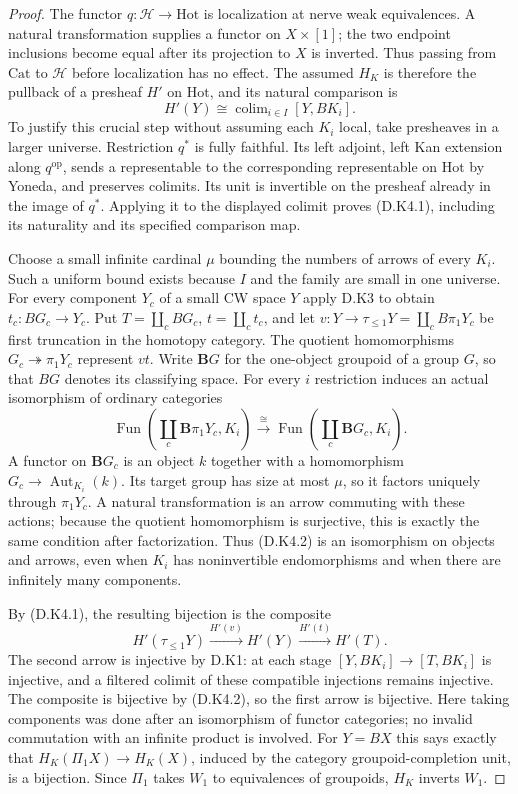\begin{proof}
The functor $q:\mathcal H\to\mathrm{Hot}$ is localization at
nerve weak equivalences. A natural transformation supplies a
functor on $X\times[1]$; the two endpoint inclusions become equal
after its projection to $X$ is inverted. Thus passing from
$\mathrm{Cat}$ to $\mathcal H$ before localization has no effect.
The assumed $H_K$ is therefore the pullback of a presheaf $H'$
on $\mathrm{Hot}$, and its natural comparison is
\[
 H'(Y)\cong\operatorname{colim}_{i\in I}[Y,BK_i].
 \tag{D.K4.1}
\]
To justify this crucial step without assuming each $K_i$ local,
take presheaves in a larger universe. Restriction $q^*$ is fully
faithful. Its left adjoint, left Kan extension along
$q^{\mathrm{op}}$, sends a representable to the corresponding
representable on $\mathrm{Hot}$ by Yoneda, and preserves colimits.
Its unit is invertible on the presheaf already in the image of
$q^*$. Applying it to the displayed colimit proves (D.K4.1),
including its naturality and its specified comparison map.

Choose a small infinite cardinal $\mu$ bounding the numbers of
arrows of every $K_i$. Such a uniform bound exists because $I$
and the family are small in one universe. For every component
$Y_c$ of a small CW space $Y$ apply D.K3 to obtain
$t_c:BG_c\to Y_c$. Put $T=\coprod_c BG_c$, $t=\coprod_c t_c$,
and let $v:Y\to\tau_{\leq1}Y=\coprod_c B\pi_1Y_c$ be first
truncation in the homotopy category. The quotient homomorphisms
$G_c\twoheadrightarrow\pi_1Y_c$ represent $vt$. Write $\mathbf B G$
for the one-object groupoid of a group $G$, so that $BG$ denotes
its classifying space. For every $i$
restriction induces an actual isomorphism of ordinary categories
\[
 \operatorname{Fun}\left(\coprod_c \mathbf B\pi_1Y_c,K_i\right)
     \xrightarrow{\cong}
 \operatorname{Fun}\left(\coprod_c \mathbf B G_c,K_i\right).
 \tag{D.K4.2}
\]
A functor on $\mathbf B G_c$ is an object $k$ together with a homomorphism
$G_c\to\operatorname{Aut}_{K_i}(k)$. Its target group has size at
most $\mu$, so it factors uniquely through $\pi_1Y_c$. A natural
transformation is an arrow commuting with these actions; because
the quotient homomorphism is surjective, this is exactly the same
condition after factorization. Thus (D.K4.2) is an isomorphism on
objects and arrows, even when $K_i$ has noninvertible
endomorphisms and when there are infinitely many components.

By (D.K4.1), the resulting bijection is the composite
\[
 H'(\tau_{\leq1}Y)\xrightarrow{H'(v)}H'(Y)
                      \xrightarrow{H'(t)}H'(T).
\]
The second arrow is injective by D.K1: at each stage
$[Y,BK_i]\to[T,BK_i]$ is injective, and a filtered colimit of
these compatible injections remains injective. The composite
is bijective by (D.K4.2), so the first arrow is bijective.
Here taking components was done after an isomorphism of functor
categories; no invalid commutation with an infinite product is
involved. For $Y=BX$ this says exactly that
$H_K(\Pi_1X)\to H_K(X)$, induced by the category groupoid-completion
unit, is a bijection. Since $\Pi_1$ takes $W_1$ to equivalences
of groupoids, $H_K$ inverts $W_1$.


\end{proof}
